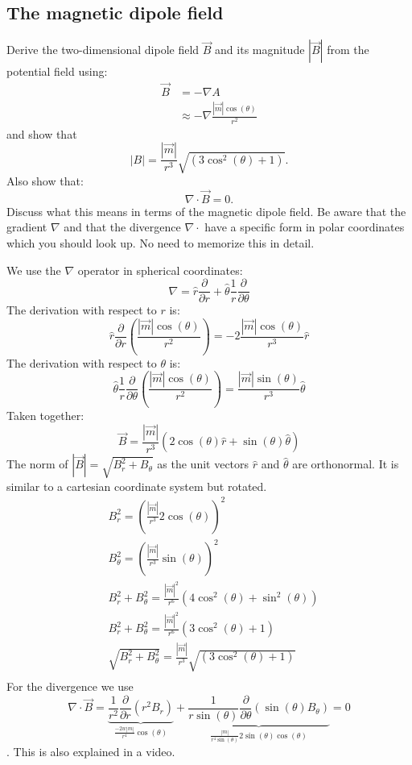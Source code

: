 \subsection{The magnetic dipole field}
\label{Sec:DipoleField}
Derive the two-dimensional dipole field $\vec{B}$ and its magnitude $|\vec{B}|$ from the potential field using:
\begin{align*}
    \vec{B} & = -\nabla A \\
       &\approx -\nabla \frac{|\vec{m}|\cos(\theta)}{r^2}
\end{align*}
and show that 
$$
    |B| = \frac{|\vec{m}|}{r^3}\sqrt{\left(3\cos^2(\theta) + 1\right)}.
$$ 
Also show that: 
$$
    \nabla \cdot \vec{B} = 0.
$$
Discuss what this means in terms of the magnetic dipole field. Be aware that the gradient $\nabla$ and that the divergence $\nabla \cdot$ have a specific form in polar coordinates which you should look up. No need to memorize this in detail.


\ifanswers
    \begin{tcolorbox}[enhanced jigsaw,breakable,pad at break*=1mm,
    colback=blue!5!white,colframe=babyblueeyes,title=Solutions]
    We use the $\nabla$ operator in spherical coordinates:
    $$
        \nabla = \hat{r}\frac{\partial}{\partial r} + \hat{\theta} \frac{1}{r}\frac{\partial}{\partial \theta}
    $$
    The derivation with respect to $r$ is:
    $$ 
        \hat{r}\frac{\partial}{\partial r} \left(\frac{|\vec{m}|\cos(\theta)}{r^2}\right) = -2\frac{|\vec{m}|\cos(\theta)}{r^3}\hat{r}
    $$
    The derivation with respect to $\theta$ is:
    $$
    \hat{\theta} \frac{1}{r}\frac{\partial}{\partial \theta}\left(\frac{|\vec{m}|\cos(\theta)}{r^2}\right) = \frac{|\vec{m}|\sin(\theta)}{r^3}\hat{\theta}
    $$
    Taken together:
    $$
        \vec{B} = \frac{|\vec{m}|}{r^3}\left(2\cos(\theta)\hat{r} + \sin(\theta)\hat{\theta} \right)
    $$
    The norm of $|\vec{B}| = \sqrt{B_r^2 + B_{\theta}}$ as the unit vectors $\hat{r}$ and $\hat{\theta}$ are orthonormal. It is similar to a cartesian coordinate system but rotated.
    \begin{align*}
        &B_r^2 = \left(\frac{|\vec{m}|}{r^3}2\cos(\theta)\right)^2 \\ 
        &B_{\theta}^2 = \left(\frac{|\vec{m}|}{r^3} \sin(\theta) \right)^2 \\
        &B_r^2+ B_{\theta}^2 = \frac{|\vec{m}|^2}{r^6}\left(4\cos^2(\theta) + \sin^2(\theta)\right) \\
        &B_r^2+ B_{\theta}^2 = \frac{|\vec{m}|^2}{r^6}\left(3\cos^2(\theta) + 1\right) \\ 
        &\sqrt{B_r^2+ B_{\theta}^2} = \frac{|\vec{m}|}{r^3}\sqrt{\left(3\cos^2(\theta) + 1\right)} \\
    \end{align*}
    For the divergence we use 
        $$\nabla \cdot \vec{B} = \underbrace{\frac{1}{r^2}\frac{\partial}{\partial r}\left(r^2B_r \right)}_{\frac{-2w|m|}{r^4}\cos(\theta)} + \underbrace{\frac{1}{r\sin(\theta)}\frac{\partial}{\partial \theta}\left(\sin(\theta) B_\theta \right)}_{\frac{|m|}{r^4\sin(\theta)}2\sin(\theta)\cos(\theta)}=0$$.
    This is also explained in a video.
    \end{tcolorbox}
\fi